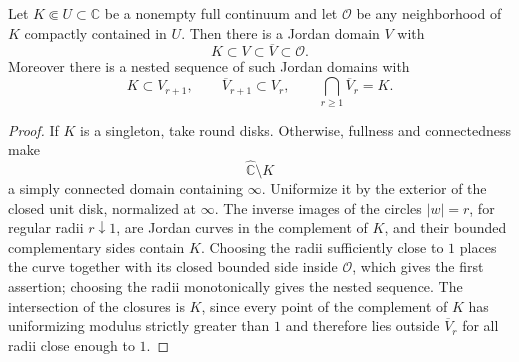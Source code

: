 \begin{lemma}
\label{lem:jordan-basis}
Let \(K\Subset U\subset\mathbb C\) be a nonempty full continuum and
let \(\mathcal O\) be any neighborhood of \(K\) compactly contained in
\(U\).  Then there is a Jordan domain \(V\) with
\[
 K\subset V\subset\overline V\subset\mathcal O .
\]
Moreover there is a nested sequence of such Jordan domains with
\[
 K\subset V_{r+1},\qquad \overline V_{r+1}\subset V_r,\qquad
 \bigcap_{r\ge1}\overline V_r=K .
\]
\end{lemma}

\begin{proof}
If \(K\) is a singleton, take round disks.  Otherwise, fullness and
connectedness make
\[
 \widehat{\mathbb C}\setminus K
\]
a simply connected domain containing \(\infty\).  Uniformize it by the
exterior of the closed unit disk, normalized at \(\infty\).  The
inverse images of the circles \(|w|=r\), for regular radii
\(r\downarrow1\), are Jordan curves in the complement of \(K\), and
their bounded complementary sides contain \(K\).  Choosing the radii
sufficiently close to \(1\) places the curve together with its closed
bounded side inside \(\mathcal O\), which gives the first assertion;
choosing the radii monotonically gives the nested sequence.  The
intersection of the closures is \(K\), since every point of the
complement of \(K\) has uniformizing modulus strictly greater than
\(1\) and therefore lies outside \(\overline V_r\) for all radii close
enough to \(1\).
\end{proof}